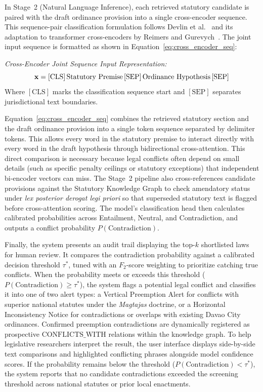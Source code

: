     In Stage~2 (Natural Language Inference), each retrieved statutory candidate is paired with the draft ordinance provision into a single cross-encoder sequence. This sequence-pair classification formulation follows Devlin et al.~\cite{devlin2019bert} and its adaptation to transformer cross-encoders by Reimers and Gurevych~\cite{reimers2019sentencebert}. The joint input sequence is formatted as shown in Equation~\ref{eq:cross_encoder_seq}:

    \noindent\textit{Cross-Encoder Joint Sequence Input Representation:}
    \begin{equation}
        \mathbf{x} = [\text{CLS}] \, \text{Statutory Premise} \, [\text{SEP}] \, \text{Ordinance Hypothesis} \, [\text{SEP}]
        \label{eq:cross_encoder_seq}
        \eqcaption{Cross-Encoder Joint Sequence Input Representation}
    \end{equation}
    \noindent Where $[\text{CLS}]$ marks the classification sequence start and $[\text{SEP}]$ separates jurisdictional text boundaries.

    Equation~\ref{eq:cross_encoder_seq} combines the retrieved statutory section and the draft ordinance provision into a single token sequence separated by delimiter tokens. This allows every word in the statutory premise to interact directly with every word in the draft hypothesis through bidirectional cross-attention. This direct comparison is necessary because legal conflicts often depend on small details (such as specific penalty ceilings or statutory exceptions) that independent bi-encoder vectors can miss. The Stage~2 pipeline also cross-references candidate provisions against the Statutory Knowledge Graph to check amendatory status under \textit{lex posterior derogat legi priori} so that superseded statutory text is flagged before cross-attention scoring. The model's classification head then calculates calibrated probabilities across Entailment, Neutral, and Contradiction, and outputs a conflict probability $P(\text{Contradiction})$.

    Finally, the system presents an audit trail displaying the top-$k$ shortlisted laws for human review. It compares the contradiction probability against a calibrated decision threshold $\tau^*$, tuned with an $F_2$-score weighting to prioritize catching true conflicts. When the probability meets or exceeds this threshold ($P(\text{Contradiction}) \ge \tau^*$), the system flags a potential legal conflict and classifies it into one of two alert types: a Vertical Preemption Alert for conflicts with superior national statutes under the \textit{Magtajas} doctrine, or a Horizontal Inconsistency Notice for contradictions or overlaps with existing Davao City ordinances. Confirmed preemption contradictions are dynamically registered as prospective $\text{CONFLICTS\_WITH}$ relations within the knowledge graph. To help legislative researchers interpret the result, the user interface displays side-by-side text comparisons and highlighted conflicting phrases alongside model confidence scores. If the probability remains below the threshold ($P(\text{Contradiction}) < \tau^*$), the system reports that no candidate contradictions exceeded the screening threshold across national statutes or prior local enactments.


